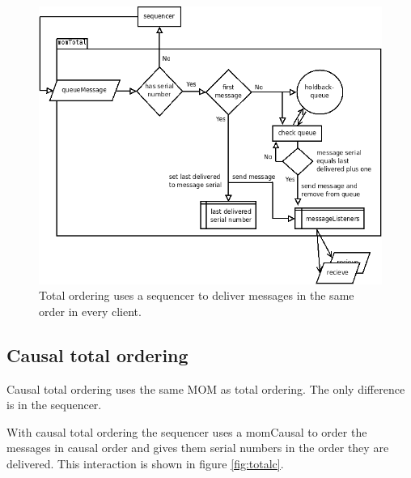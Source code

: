 \documentclass[english]{article}
\begin{document}
\begin{figure}
\includegraphics[width=\textwidth]{momTotal.png}
\caption{Total ordering uses a sequencer to deliver messages in the same order in every client.}
\label{fig:total}
\end{figure}

\subsection{Causal total ordering}
Causal total ordering uses the same MOM as total ordering. The only difference is in the sequencer.

With causal total ordering the sequencer uses a momCausal to order the messages in causal order and gives them serial numbers in the order they are delivered. This interaction is shown in figure \vref{fig:totalc}.
\end{document}
